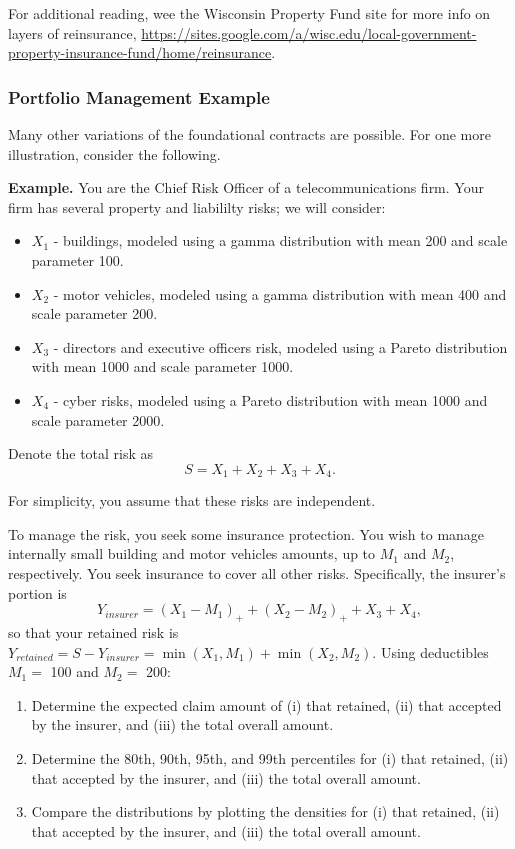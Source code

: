 \documentclass[]{book}
\theoremstyle{definition}
\theoremstyle{definition}
\theoremstyle{definition}
\theoremstyle{remark}
\begin{document}
For additional reading, wee the Wisconsin Property Fund site for more
info on layers of reinsurance,
\url{https://sites.google.com/a/wisc.edu/local-government-property-insurance-fund/home/reinsurance}.

\subsubsection{Portfolio Management
Example}\label{portfolio-management-example}

Many other variations of the foundational contracts are possible. For
one more illustration, consider the following.

\textbf{Example.} You are the Chief Risk Officer of a telecommunications
firm. Your firm has several property and liabililty risks; we will
consider:

\begin{itemize}
\item
  \(X_1\) - buildings, modeled using a gamma distribution with mean 200
  and scale parameter 100.
\item
  \(X_2\) - motor vehicles, modeled using a gamma distribution with mean
  400 and scale parameter 200.
\item
  \(X_3\) - directors and executive officers risk, modeled using a
  Pareto distribution with mean 1000 and scale parameter 1000.
\item
  \(X_4\) - cyber risks, modeled using a Pareto distribution with mean
  1000 and scale parameter 2000.
\end{itemize}

Denote the total risk as \[S = X_1 + X_2 + X_3 + X_4 .\]

For simplicity, you assume that these risks are independent.

To manage the risk, you seek some insurance protection. You wish to
manage internally small building and motor vehicles amounts, up to
\(M_1\) and \(M_2\), respectively. You seek insurance to cover all other
risks. Specifically, the insurer's portion is
\[ Y_{insurer} = (X_1 - M_1)_+ + (X_2 - M_2)_+ + X_3 + X_4 ,\] so that
your retained risk is
\(Y_{retained}= S- Y_{insurer} = \min(X_1,M_1) + \min(X_2,M_2)\). Using
deductibles \(M_1=\) 100 and \(M_2=\) 200:

\begin{enumerate}
\def\labelenumi{\alph{enumi}.}
\item
  Determine the expected claim amount of (i) that retained, (ii) that
  accepted by the insurer, and (iii) the total overall amount.
\item
  Determine the 80th, 90th, 95th, and 99th percentiles for (i) that
  retained, (ii) that accepted by the insurer, and (iii) the total
  overall amount.
\item
  Compare the distributions by plotting the densities for (i) that
  retained, (ii) that accepted by the insurer, and (iii) the total
  overall amount.
\end{enumerate}
\end{document}
